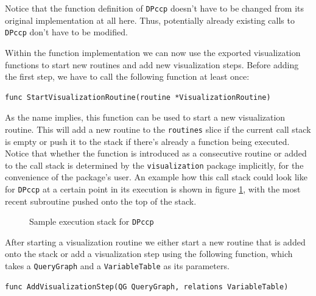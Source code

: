\begin{note}
Notice that the function definition of \texttt{DPccp} doesn't have to be changed from its original implementation at all here. Thus, potentially already existing calls to \texttt{DPccp} don't have to be modified.
\end{note}

Within the function implementation we can now use the exported visualization functions to start new routines and add new visualization steps. Before adding the first step, we have to call the following function at least once: 
\begin{verbatim}
func StartVisualizationRoutine(routine *VisualizationRoutine)
\end{verbatim}

As the name implies, this function can be used to start a new visualization routine. This will add a new routine to the \texttt{routines} slice if the current call stack is empty or push it to the stack if there's already a function being executed. Notice that whether the function is introduced as a consecutive routine or added to the call stack is determined by the \texttt{visualization} package implicitly, for the convenience of the package's user. An example how this call stack could look like for \texttt{DPccp} at a certain point in its execution is shown in figure \ref{fig:execution-stack}, with the most recent subroutine pushed onto the top of the stack.

\begin{figure}[H]
\caption{Sample execution stack for \texttt{DPccp}}
\label{fig:execution-stack}
\end{figure}

After starting a visualization routine we either start a new routine that is added onto the stack or add a visualization step using the following function, which takes a \texttt{QueryGraph} and a \texttt{VariableTable} as its parameters.

\begin{verbatim}
func AddVisualizationStep(QG QueryGraph, relations VariableTable)
\end{verbatim}


